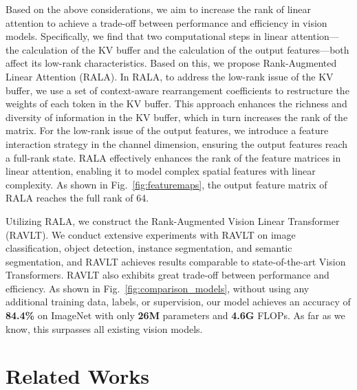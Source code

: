 \documentclass[10pt,twocolumn,letterpaper]{article}
\begin{document}
Based on the above considerations, we aim to increase the rank of linear attention to achieve a trade-off between performance and efficiency in vision models. Specifically, we find that two computational steps in linear attention---the calculation of the KV buffer and the calculation of the output features---both affect its low-rank characteristics. Based on this, we propose Rank-Augmented Linear Attention (RALA). In RALA, to address the low-rank issue of the KV buffer, we use a set of context-aware rearrangement coefficients to restructure the weights of each token in the KV buffer. This approach enhances the richness and diversity of information in the KV buffer, which in turn increases the rank of the matrix. For the low-rank issue of the output features, we introduce a feature interaction strategy in the channel dimension, ensuring the output features reach a full-rank state. RALA effectively enhances the rank of the feature matrices in linear attention, enabling it to model complex spatial features with linear complexity. As shown in Fig.~\ref{fig:featuremaps}, the output feature matrix of RALA reaches the full rank of 64.

Utilizing RALA, we construct the Rank-Augmented Vision Linear Transformer (RAVLT). We conduct extensive experiments with RAVLT on image classification, object detection, instance segmentation, and semantic segmentation, and RAVLT achieves results comparable to state-of-the-art Vision Transformers. RAVLT also exhibits great trade-off between performance and efficiency. As shown in Fig.~\ref{fig:comparison_models}, without using any additional training data, labels, or supervision, our model achieves an accuracy of \textbf{84.4\%} on ImageNet with only \textbf{26M} parameters and \textbf{4.6G} FLOPs. As far as we know, this surpasses all existing vision models.

\section{Related Works}
\end{document}
